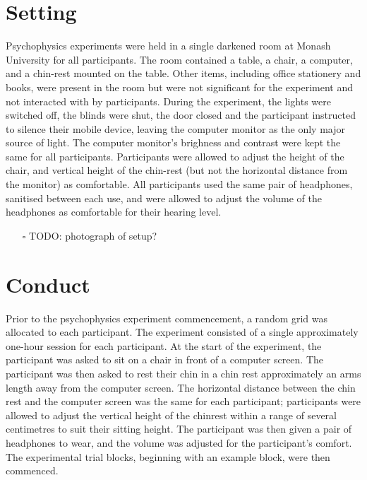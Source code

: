 \documentclass[a4paper,11pt,openany]{book}
\begin{document}
\section*{Setting}
\label{sec:org84c2857}

Psychophysics experiments were held in a single darkened room at Monash University for all participants.
The room contained a table, a chair, a computer, and a chin-rest mounted on the table.
Other items, including office stationery and books, were present in the room but were not significant for the experiment and not interacted with by participants.
During the experiment, the lights were switched off, the blinds were shut, the door closed and the participant instructed to silence their mobile device, leaving the computer monitor as the only major source of light.
The computer monitor's brighness and contrast were kept the same for all participants.
Participants were allowed to adjust the height of the chair, and vertical height of the chin-rest (but not the horizontal distance from the monitor) as comfortable.
All participants used the same pair of headphones, sanitised between each use, and were allowed to adjust the volume of the headphones as comfortable for their hearing level.

\begin{itemize}
\item[{$\square$}] TODO: photograph of setup?
\end{itemize}

\section*{Conduct}
\label{sec:org3ee3810}

Prior to the psychophysics experiment commencement, a random grid was allocated to each participant.
The experiment consisted of a single approximately one-hour session for each participant.
At the start of the experiment, the participant was asked to sit on a chair in front of a computer screen.
The participant was then asked to rest their chin in a chin rest approximately an arms length away from the computer screen.
The horizontal distance between the chin rest and the computer screen was the same for each participant; participants were allowed to adjust the vertical height of the chinrest within a range of several centimetres to suit their sitting height.
The participant was then given a pair of headphones to wear, and the volume was adjusted for the participant's comfort.
The experimental trial blocks, beginning with an example block, were then commenced.
\end{document}
